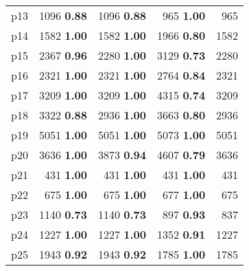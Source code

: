 \begin{tabular}{lrrrr}
\multicolumn{1}{l|}{p13} & {\footnotesize 1096} \textbf{0.88} & {\footnotesize 1096} \textbf{0.88} & {\footnotesize 965} \textbf{1.00} & \multicolumn{1}{|r}{965}\\
\multicolumn{1}{l|}{p14} & {\footnotesize 1582} \textbf{1.00} & {\footnotesize 1582} \textbf{1.00} & {\footnotesize 1966} \textbf{0.80} & \multicolumn{1}{|r}{1582}\\
\multicolumn{1}{l|}{p15} & {\footnotesize 2367} \textbf{0.96} & {\footnotesize 2280} \textbf{1.00} & {\footnotesize 3129} \textbf{0.73} & \multicolumn{1}{|r}{2280}\\
\multicolumn{1}{l|}{p16} & {\footnotesize 2321} \textbf{1.00} & {\footnotesize 2321} \textbf{1.00} & {\footnotesize 2764} \textbf{0.84} & \multicolumn{1}{|r}{2321}\\
\multicolumn{1}{l|}{p17} & {\footnotesize 3209} \textbf{1.00} & {\footnotesize 3209} \textbf{1.00} & {\footnotesize 4315} \textbf{0.74} & \multicolumn{1}{|r}{3209}\\
\multicolumn{1}{l|}{p18} & {\footnotesize 3322} \textbf{0.88} & {\footnotesize 2936} \textbf{1.00} & {\footnotesize 3663} \textbf{0.80} & \multicolumn{1}{|r}{2936}\\
\multicolumn{1}{l|}{p19} & {\footnotesize 5051} \textbf{1.00} & {\footnotesize 5051} \textbf{1.00} & {\footnotesize 5073} \textbf{1.00} & \multicolumn{1}{|r}{5051}\\
\multicolumn{1}{l|}{p20} & {\footnotesize 3636} \textbf{1.00} & {\footnotesize 3873} \textbf{0.94} & {\footnotesize 4607} \textbf{0.79} & \multicolumn{1}{|r}{3636}\\
\multicolumn{1}{l|}{p21} & {\footnotesize 431} \textbf{1.00} & {\footnotesize 431} \textbf{1.00} & {\footnotesize 431} \textbf{1.00} & \multicolumn{1}{|r}{431}\\
\multicolumn{1}{l|}{p22} & {\footnotesize 675} \textbf{1.00} & {\footnotesize 675} \textbf{1.00} & {\footnotesize 677} \textbf{1.00} & \multicolumn{1}{|r}{675}\\
\multicolumn{1}{l|}{p23} & {\footnotesize 1140} \textbf{0.73} & {\footnotesize 1140} \textbf{0.73} & {\footnotesize 897} \textbf{0.93} & \multicolumn{1}{|r}{837}\\
\multicolumn{1}{l|}{p24} & {\footnotesize 1227} \textbf{1.00} & {\footnotesize 1227} \textbf{1.00} & {\footnotesize 1352} \textbf{0.91} & \multicolumn{1}{|r}{1227}\\
\multicolumn{1}{l|}{p25} & {\footnotesize 1943} \textbf{0.92} & {\footnotesize 1943} \textbf{0.92} & {\footnotesize 1785} \textbf{1.00} & \multicolumn{1}{|r}{1785}\\

\end{tabular}
